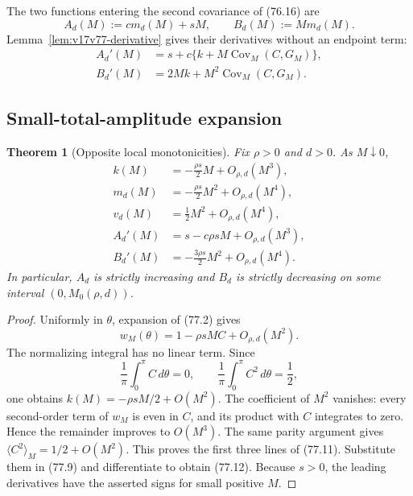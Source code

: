 \documentclass[11pt]{article}
\newtheorem{theorem}{Theorem}[section]
\theoremstyle{remark}
\begin{document}
The two functions entering the second covariance of (76.16) are
\[
 A_d(M):=cm_d(M)+sM,
 \qquad
 B_d(M):=Mm_d(M).                                 \tag{77.9}
\]
Lemma~\ref{lem:v17v77-derivative} gives their derivatives without an
endpoint term:
\[
\begin{aligned}
 A_d'(M)&=s+c\{k+M\operatorname{Cov}_M(C,G_M)\},\\
 B_d'(M)&=2Mk+M^2\operatorname{Cov}_M(C,G_M).     \tag{77.10}
\end{aligned}
\]

\subsection{Small-total-amplitude expansion}

\begin{theorem}[Opposite local monotonicities]
\label{thm:v17v77-smallM}
Fix \(\rho>0\) and \(d>0\).  As \(M\downarrow0\),
\[
\begin{aligned}
 k(M)&=-\frac{\rho s}{2}M+O_{\rho,d}(M^3),\\
 m_d(M)&=-\frac{\rho s}{2}M^2+O_{\rho,d}(M^4),\\
 v_d(M)&=\frac12M^2+O_{\rho,d}(M^4),              \tag{77.11}\\
 A_d'(M)&=s-c\rho sM+O_{\rho,d}(M^3),\\
 B_d'(M)&=-\frac{3\rho s}{2}M^2+O_{\rho,d}(M^4).
                                                               \tag{77.12}
\end{aligned}
\]
In particular, \(A_d\) is strictly increasing and \(B_d\) is
strictly decreasing on some interval \((0,M_0(\rho,d))\).
\end{theorem}

\begin{proof}
Uniformly in \(\theta\), expansion of (77.2) gives
\[
 w_M(\theta)=1-\rho sMC+O_{\rho,d}(M^2).          \tag{77.13}
\]
The normalizing integral has no linear term.  Since
\[
 \frac1\pi\int_0^\pi C\,d\theta=0,
 \qquad
 \frac1\pi\int_0^\pi C^2\,d\theta=\frac12,      \tag{77.14}
\]
one obtains \(k(M)=-\rho sM/2+O(M^2)\).  The
coefficient of \(M^2\) vanishes: every second-order term of
\(w_M\) is even in \(C\), and its product with \(C\) integrates to
zero.  Hence the remainder improves to \(O(M^3)\).  The same parity
argument gives
\(\langle C^2\rangle_M=1/2+O(M^2)\).  This proves the first three
lines of (77.11).  Substitute them in (77.9) and differentiate to
obtain (77.12).  Because \(s>0\), the leading derivatives have the
asserted signs for small positive \(M\).
\end{proof}
\end{document}
